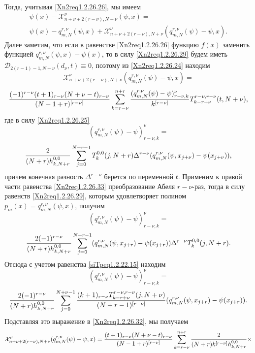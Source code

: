 Тогда, учитывая \eqref{Xn2req1.2.26.26}, мы имеем
\begin{multline}\label{Xn2req1.2.26.31}
\psi(x)-\mathcal{X}^\nu_{n+\nu+2(r-\nu),N+\nu}(\psi,x)=\\
\psi(x)-q_{m,N}^{r,\nu}(\psi,x)+\mathcal{X}^\nu_{n+\nu+2(r-\nu),N+\nu}(q_{m,N}^{r,\nu}(\psi)-\psi,x).
\end{multline}
Далее заметим, что если в равенстве  \eqref{Xn2req1.2.26.26} функцию $f(x)$ заменить функцией $q_{m,N}^{r,\nu}(\psi,x)-\psi(x)$,  то в силу
 \eqref{Xn2req1.2.26.29} будем  иметь $\mathcal{D}_{2(r-1)-1,N+\nu}(d_\nu,t)\equiv0$, поэтому из \eqref{Xn2req1.2.26.24} находим
$$
\mathcal{X}^\nu_{n+\nu+2(r-\nu),N+\nu}(q_{m,N}^{r,\nu}(\psi)-\psi,x)=
$$
\begin{equation}\label{Xn2req1.2.26.32}
{(-1)^{r-\nu}(t+1)_{r-\nu}(N+\nu-t)_{r-\nu}\over (N-1+r)^{[r-\nu]}}
\sum_{k=r-\nu}^{n+r} {(q_{m,N}^{r,\nu}(\psi)-\psi)_{r-\nu,k}^\nu\over k^{[r-\nu]}}
T_{k-r+\nu}^{r-\nu,r-\nu}(t,N+\nu),
\end{equation}
где в силу \eqref{Xn2req1.2.26.25}
$$
 (q_{m,N}^{r,\nu}(\psi)-\psi)_{r-\nu,k}^\nu=
 $$
 \begin{equation}\label{Xn2req1.2.26.33}
    {2\over (N+r)h_{k,N+r}^{0,0}}
     \sum_{j=0}^{N+r-1}T_k^{0,0}(j,N+r)\Delta^{r-\nu}(q_{m,N}^{r,\nu}(\psi,x_{j+\nu})-\psi(x_{j+\nu})),
 \end{equation}
причем конечная разность $\Delta^{r-\nu}$ берется по переменной $t$. Применим к правой части равенства \eqref{Xn2req1.2.26.33}
преобразование Абеля $r-\nu$-раз, тогда в силу равенств \eqref{Xn2req1.2.26.29}, которым удовлетворяет полином $p_m(x)=q_{m,N}^{r,\nu}(\psi,x)$, получим
  $$
 (q_{m,N}^{r,\nu}(\psi)-\psi)_{r-\nu,k}^\nu=
 $$
 \begin{equation}\label{Xn2req1.2.26.34}
    {2(-1)^{r-\nu}\over (N+r)h_{k,N+r}^{0,0}}
     \sum_{j=0}^{N+r-1}(q_{m,N}^{r,\nu}(\psi,x_{j+r})-\psi(x_{j+r}))\Delta^{r-\nu}T_k^{0,0}(j,N+r).
 \end{equation}
 Отсюда с учетом равенства \eqref{siTpeq1.2.22.15} находим
$$
 (q_{m,N}^{r,\nu}(\psi)-\psi)_{r-\nu,k}^\nu=
 $$
 \begin{equation}\label{Xn2req1.2.26.35}
    {2(-1)^{r-\nu}\over (N+r)h_{k,N+r}^{0,0}}
     \sum_{j=0}^{N+\nu-1}{(k+1)_{r-\nu}T_{k-r+\nu}^{r-\nu,r-\nu}(j,N+\nu)\over (N+r-1)^{[r-\nu]}}(q_{m,N}^{r,\nu}(\psi,x_{j+r})-\psi(x_{j+r})).
 \end{equation}
Подставляя это выражение в \eqref{Xn2req1.2.26.32}, мы получаем
$$
\mathcal{X}^\nu_{n+\nu+2(r-\nu),N+\nu}(q_{m,N}^{r,\nu}(\psi)-\psi,x)=
{(t+1)_{r-\nu}(N+\nu-t)_{r-\nu}\over (N-1+r)^{[r-\nu]}}
\sum_{k=r-\nu}^{n+r} {2\over (N+r)k^{[r-\nu]}h_{k,N+r}^{0,0}}\times
$$
